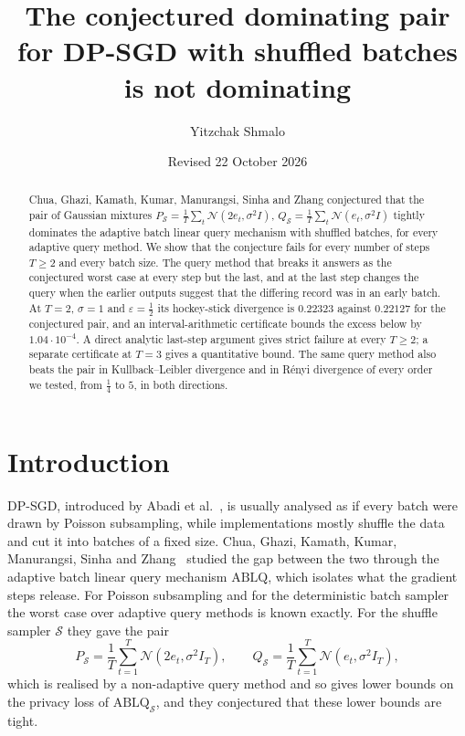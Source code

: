 \documentclass[11pt]{amsart}
\title[The conjectured pair for shuffled ABLQ is not dominating]{The conjectured dominating pair for DP-SGD with shuffled batches is not dominating}
\author{Yitzchak Shmalo}
\date{Revised 22 October 2026}
\theoremstyle{definition}
\theoremstyle{remark}
\newcommand{\N}{\mathcal N}
\begin{document}
\begin{abstract}
Chua, Ghazi, Kamath, Kumar, Manurangsi, Sinha and Zhang conjectured that the pair of Gaussian mixtures $P_{\mathcal S}=\frac1T\sum_t\N(2e_t,\sigma^2I)$, $Q_{\mathcal S}=\frac1T\sum_t\N(e_t,\sigma^2I)$ tightly dominates the adaptive batch linear query mechanism with shuffled batches, for every adaptive query method. We show that the conjecture fails for every number of steps $T\ge2$ and every batch size. The query method that breaks it answers as the conjectured worst case at every step but the last, and at the last step changes the query when the earlier outputs suggest that the differing record was in an early batch. At $T=2$, $\sigma=1$ and $\varepsilon=\frac12$ its hockey-stick divergence is $0.22323$ against $0.22127$ for the conjectured pair, and an interval-arithmetic certificate bounds the excess below by $1.04\cdot10^{-4}$. A direct analytic last-step argument gives strict failure at every $T\ge2$; a separate certificate at $T=3$ gives a quantitative bound. The same query method also beats the pair in Kullback--Leibler divergence and in R\'enyi divergence of every order we tested, from $\frac14$ to $5$, in both directions.
\end{abstract}
\maketitle

\section{Introduction}

DP-SGD, introduced by Abadi et al.~\cite{Aba16}, is usually analysed as if every batch were drawn by Poisson subsampling, while implementations mostly shuffle the data and cut it into batches of a fixed size. Chua, Ghazi, Kamath, Kumar, Manurangsi, Sinha and Zhang~\cite{CGKKMSZ24} studied the gap between the two through the adaptive batch linear query mechanism $\mathrm{ABLQ}$, which isolates what the gradient steps release. For Poisson subsampling and for the deterministic batch sampler the worst case over adaptive query methods is known exactly. For the shuffle sampler $\mathcal S$ they gave the pair
\begin{equation}\label{eq:pair}
P_{\mathcal S}=\frac1T\sum_{t=1}^T\N(2e_t,\sigma^2I_T),\qquad Q_{\mathcal S}=\frac1T\sum_{t=1}^T\N(e_t,\sigma^2I_T),
\end{equation}
which is realised by a non-adaptive query method and so gives lower bounds on the privacy loss of $\mathrm{ABLQ}_{\mathcal S}$, and they conjectured that these lower bounds are tight.
\end{document}
